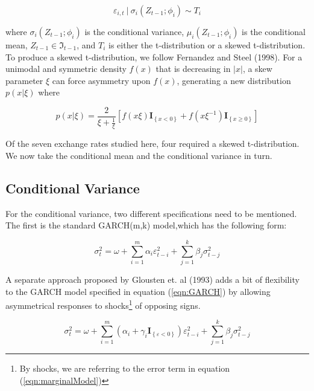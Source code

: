 \documentclass[12pt]{article}
\begin{document}
\begin{equation}
\varepsilon_{i,t}~|~\sigma_{i}\left(Z_{t - 1}; \phi_{i}\right) \sim T_{i}
\end{equation}

where $\sigma_{i}\left(Z_{t - 1}; \phi_{i}\right)$ is the conditional
variance, $\mu_{i}\left(Z_{t - 1}; \phi_{i}\right)$ is the conditional
mean, $Z_{t - 1} \in \Im_{t-1}$, and $T_{i}$ is either the t-distribution
or a skewed t-distribution. To produce a skewed t-distribution, we follow
Fernandez and Steel (1998). For a unimodal and symmetric density
$f\left(x\right)$ that is decreasing in $\left\vert x\right\vert$, a skew
parameter $\xi$ can force asymmetry upon $f\left(x\right)$, generating a
new distribution $p\left(x|\xi\right)$ where

\begin{equation}
p\left(x|\xi \right) = \frac{2}{\xi + \frac{1}{\xi}} \left[f\left(x\xi\right) \mathbf{I}_{\left\{x < 0\right\}} + f\left(x\xi^{-1}\right) \mathbf{I}_{\left\{x \geq 0\right\}}\right]
\end{equation}

Of the seven exchange rates studied here, four required a skewed
t-distribution. We now take the conditional mean and the conditional
variance in turn. 

\subsection{Conditional Variance}

For the conditional variance, two different specifications need to be
mentioned. The first is the standard GARCH(m,k) model,which has the
following form:

\begin{equation} \label{eqn:GARCH}
\sigma_{t}^{2} = \omega + \sum_{i = 1}^{m}\alpha_{i} \varepsilon_{t - i}^{2} + \sum_{j = 1}^{k}\beta_{j} \sigma_{t - j}^{2}
\end{equation}

A separate approach proposed by Glousten et. al (1993) adds a bit of
flexibility to the GARCH model specified in equation (\ref{eqn:GARCH})
by allowing asymmetrical responses to shocks\footnote{By shocks, we are
referring to the error term in equation (\ref{eqn:marginalModel})} of
opposing signs. 

\begin{equation}
\sigma_{t}^{2} = \omega + \sum_{i = 1}^{m}\left(\alpha_{i} + \gamma_{i}\mathbf{I}_{\left\{\varepsilon < 0 \right\}}\right) \varepsilon_{t - i}^{2} + \sum_{j = 1}^{k}\beta_{j}\sigma_{t- j}^{2}
\end{equation}
\end{document}
